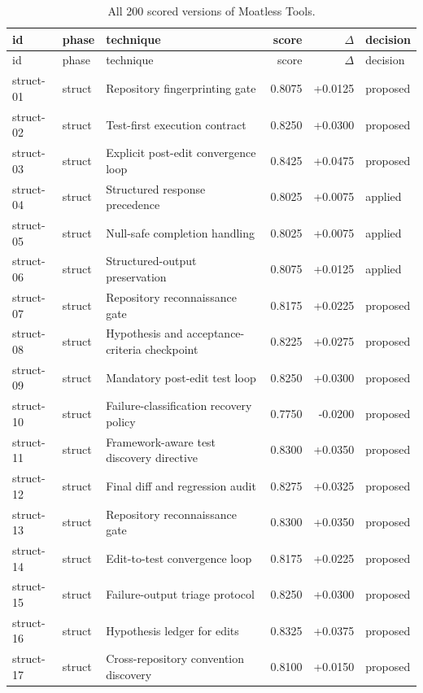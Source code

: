 \begin{center}\scriptsize\begin{longtable}{llp{5.2cm}rrl}
\caption{All 200 scored versions of Moatless Tools.}\\
\toprule id & phase & technique & score & $\Delta$ & decision \\ \midrule \endfirsthead
\toprule id & phase & technique & score & $\Delta$ & decision \\ \midrule \endhead
struct-01 & struct & Repository fingerprinting gate & 0.8075 & +0.0125 & proposed \\
struct-02 & struct & Test-first execution contract & 0.8250 & +0.0300 & proposed \\
struct-03 & struct & Explicit post-edit convergence loop & 0.8425 & +0.0475 & proposed \\
struct-04 & struct & Structured response precedence & 0.8025 & +0.0075 & applied \\
struct-05 & struct & Null-safe completion handling & 0.8025 & +0.0075 & applied \\
struct-06 & struct & Structured-output preservation & 0.8075 & +0.0125 & applied \\
struct-07 & struct & Repository reconnaissance gate & 0.8175 & +0.0225 & proposed \\
struct-08 & struct & Hypothesis and acceptance-criteria checkpoint & 0.8225 & +0.0275 & proposed \\
struct-09 & struct & Mandatory post-edit test loop & 0.8250 & +0.0300 & proposed \\
struct-10 & struct & Failure-classification recovery policy & 0.7750 & -0.0200 & proposed \\
struct-11 & struct & Framework-aware test discovery directive & 0.8300 & +0.0350 & proposed \\
struct-12 & struct & Final diff and regression audit & 0.8275 & +0.0325 & proposed \\
struct-13 & struct & Repository reconnaissance gate & 0.8300 & +0.0350 & proposed \\
struct-14 & struct & Edit-to-test convergence loop & 0.8175 & +0.0225 & proposed \\
struct-15 & struct & Failure-output triage protocol & 0.8250 & +0.0300 & proposed \\
struct-16 & struct & Hypothesis ledger for edits & 0.8325 & +0.0375 & proposed \\
struct-17 & struct & Cross-repository convention discovery & 0.8100 & +0.0150 & proposed \\

\end{longtable}
\end{center}

